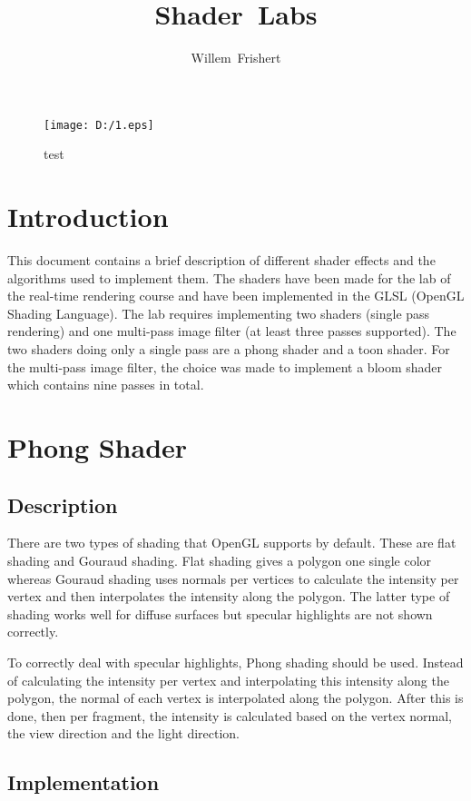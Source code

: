 \documentclass[a4paper,12pt]{article}
\author{Willem~Frishert}
\title{Shader~Labs}
\begin{document}
\pagestyle{headings}
\maketitle
\begin{figure}
	\centering
		\texttt{[image: D:/1.eps]}
	\caption{test}
	\label{fig:1}
\end{figure}

\section{Introduction}
\label{sec:Introduction}
This document contains a brief description of different shader effects and the algorithms used to implement them. The shaders have been made for the lab of the real-time rendering course and have been implemented in the GLSL (OpenGL Shading Language). The lab requires implementing two shaders (single pass rendering) and one multi-pass image filter (at least three passes supported). The two shaders doing only a single pass are a phong shader and a toon shader. For the multi-pass image filter, the choice was made to implement a bloom shader which contains nine passes in total.

\section{Phong Shader}
\label{sec:PhongShader}
\subsection{Description}
\label{sec:Description}

There are two types of shading that OpenGL supports by default. These are flat shading and Gouraud shading. Flat shading gives a polygon one single color whereas Gouraud shading uses normals per vertices to calculate the intensity per vertex and then interpolates the intensity along the polygon. The latter type of shading works well for diffuse surfaces but specular highlights are not shown correctly.

To correctly deal with specular highlights, Phong shading should be used. Instead of calculating the intensity per vertex and interpolating this intensity along the polygon, the normal of each vertex is interpolated along the polygon. After this is done, then per fragment, the intensity is calculated based on the vertex normal, the view direction and the light direction.


\subsection{Implementation}
\label{sec:ImplementationPhongShader}
\end{document}
